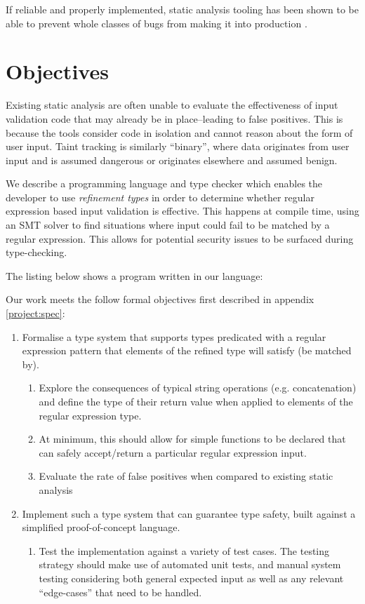 If reliable and properly implemented, static analysis tooling has been shown to be able to prevent whole classes of
bugs from making it into production \citep{sadowski2018lessons}.

\section{Objectives}

Existing static analysis are often unable to evaluate the effectiveness of input validation code that may already be in
place--leading to false positives.
This is because the tools consider code in isolation and cannot reason about the form of user input.
Taint tracking is similarly ``binary'', where data originates from user input and is assumed dangerous or originates
elsewhere and assumed benign.

We describe a programming language and type checker which enables the developer to use \emph{refinement types} in order to determine whether regular expression based
input validation is effective.
This happens at compile time, using an SMT solver to find situations where input could fail to be matched by a regular
expression.
This allows for potential security issues to be surfaced during type-checking.

The listing below shows a program written in our language:


Our work meets the follow formal objectives first described in appendix \ref{project:spec}:

\begin{enumerate}
    \item Formalise a type system that supports types predicated with a regular expression pattern that elements of the refined type will satisfy (be matched by).
    \begin{enumerate}
        \item Explore the consequences of typical string operations (e.g. concatenation) and define the type of
        their return value when applied to elements of the regular expression type.

        \item At minimum, this should allow for simple functions to be declared that can safely accept/return a
        particular regular expression input.
        \item Evaluate the rate of false positives when compared to existing static analysis
    \end{enumerate}
    \item Implement such a type system that can guarantee type safety, built against a simplified proof-of-concept
    language.
    \begin{enumerate}
        \item Test the implementation against a variety of test cases. The testing strategy should make use of
        automated unit tests, and manual system testing considering both general expected input as well as
        any relevant ``edge-cases'' that need to be handled.
    \end{enumerate}
\end{enumerate}

